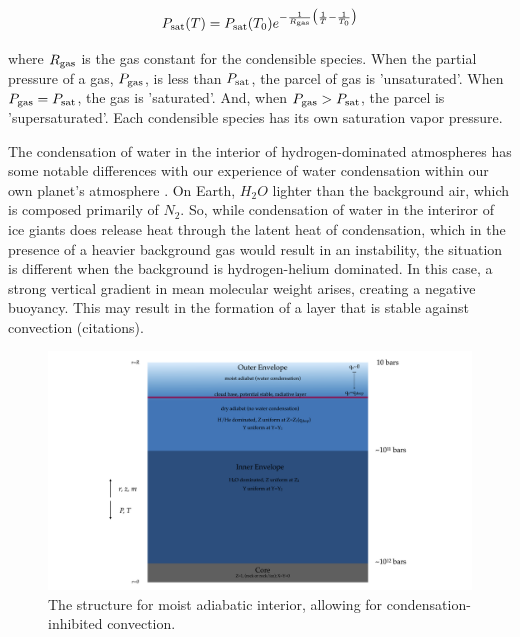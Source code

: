 \documentclass[11pt]{ucscthesisbs}
\begin{document}
\begin{equation}
  P_{\rm sat}(T) = P_{\rm sat}(T_{\rm 0})e^{-\frac{1}{R_{\rm gas}}\big(\frac{1}{T}-\frac{1}{T_{\rm 0}}\big)}
\end{equation}

where $R_{\rm gas}$ is the gas constant for the condensible species. When the partial pressure of a gas, $P_{\rm gas}$, is less than $P_{\rm sat}$, the parcel of gas is 'unsaturated'. When $P_{\rm gas} = P_{\rm sat}$, the gas is 'saturated'. And, when $P_{\rm gas} > P_{\rm sat}$, the parcel is 'supersaturated'. Each condensible species has its own saturation vapor pressure.

The condensation of water in the interior of hydrogen-dominated atmospheres has some notable differences with our experience of water condensation within our own planet's atmosphere \citep{leconte_2017} \citep{friedson_2017} \citep{guillot_2019} \citep{guillot_1995}. On Earth, $H_{2}O$ lighter than the background air, which is composed primarily of $N_{2}$. So, while condensation of water in the interiror of ice giants does release heat through the latent heat of condensation, which in the presence of a heavier background gas would result in an instability, the situation is different when the background is hydrogen-helium dominated. In this case, a strong vertical gradient in mean molecular weight arises, creating a negative buoyancy. This may result in the formation of a layer that is stable against convection (citations). 


\begin{figure}[ht!]
 \centerline{
  \includegraphics[width=8.0in]{figures/moist_adiabat_structure.png}
 }
\caption[Interior Structure for Moist Adiabat]
{The structure for moist adiabatic interior, allowing for condensation-inhibited convection.}
\label{fig:moist_interior}
\end{figure}
\end{document}
